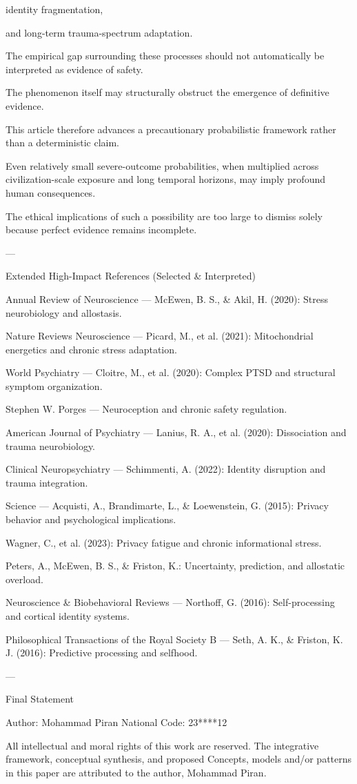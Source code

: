 identity fragmentation,

and long-term trauma-spectrum adaptation.


The empirical gap surrounding these processes should not automatically be interpreted as evidence of safety.

The phenomenon itself may structurally obstruct the emergence of definitive evidence.

This article therefore advances a precautionary probabilistic framework rather than a deterministic claim.

Even relatively small severe-outcome probabilities, when multiplied across civilization-scale exposure and long temporal horizons, may imply profound human consequences.

The ethical implications of such a possibility are too large to dismiss solely because perfect evidence remains incomplete.


---

Extended High-Impact References (Selected & Interpreted)

Annual Review of Neuroscience — McEwen, B. S., & Akil, H. (2020): Stress neurobiology and allostasis.

Nature Reviews Neuroscience — Picard, M., et al. (2021): Mitochondrial energetics and chronic stress adaptation.

World Psychiatry — Cloitre, M., et al. (2020): Complex PTSD and structural symptom organization.

Stephen W. Porges — Neuroception and chronic safety regulation.

American Journal of Psychiatry — Lanius, R. A., et al. (2020): Dissociation and trauma neurobiology.

Clinical Neuropsychiatry — Schimmenti, A. (2022): Identity disruption and trauma integration.

Science — Acquisti, A., Brandimarte, L., & Loewenstein, G. (2015): Privacy behavior and psychological implications.

Wagner, C., et al. (2023): Privacy fatigue and chronic informational stress.

Peters, A., McEwen, B. S., & Friston, K.: Uncertainty, prediction, and allostatic overload.

Neuroscience & Biobehavioral Reviews — Northoff, G. (2016): Self-processing and cortical identity systems.

Philosophical Transactions of the Royal Society B — Seth, A. K., & Friston, K. J. (2016): Predictive processing and selfhood.



---

Final Statement

Author: Mohammad Piran
National Code: 23****12

All intellectual and moral rights of this work are reserved. The integrative framework, conceptual synthesis, and proposed Concepts, models and/or patterns in this paper are attributed to the author, Mohammad Piran.
